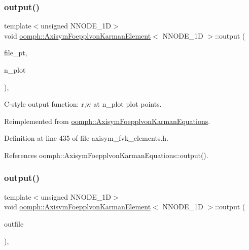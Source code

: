 \subsubsection{\texorpdfstring{output()}{output()}\hspace{0.1cm}{\footnotesize\ttfamily [4/8]}}
{\footnotesize\ttfamily template$<$unsigned N\+N\+O\+D\+E\+\_\+1D$>$ \\
void \hyperlink{classoomph_1_1AxisymFoepplvonKarmanElement}{oomph\+::\+Axisym\+Foepplvon\+Karman\+Element}$<$ N\+N\+O\+D\+E\+\_\+1D $>$\+::output (\begin{DoxyParamCaption}\item[{F\+I\+LE $\ast$}]{file\+\_\+pt,  }\item[{const unsigned \&}]{n\+\_\+plot }\end{DoxyParamCaption})\hspace{0.3cm}{\ttfamily [inline]}, {\ttfamily [virtual]}}



C-\/style output function\+: r,w at n\+\_\+plot plot points. 



Reimplemented from \hyperlink{classoomph_1_1AxisymFoepplvonKarmanEquations_a5278f37c336b7a4bd2931fdedd2945f8}{oomph\+::\+Axisym\+Foepplvon\+Karman\+Equations}.



Definition at line 435 of file axisym\+\_\+fvk\+\_\+elements.\+h.



References oomph\+::\+Axisym\+Foepplvon\+Karman\+Equations\+::output().

\mbox{\label{classoomph_1_1AxisymFoepplvonKarmanElement_a76cf09e19fc810a96251a64572248f76}} 
\subsubsection{\texorpdfstring{output()}{output()}\hspace{0.1cm}{\footnotesize\ttfamily [5/8]}}
{\footnotesize\ttfamily template$<$unsigned N\+N\+O\+D\+E\+\_\+1D$>$ \\
void \hyperlink{classoomph_1_1AxisymFoepplvonKarmanElement}{oomph\+::\+Axisym\+Foepplvon\+Karman\+Element}$<$ N\+N\+O\+D\+E\+\_\+1D $>$\+::output (\begin{DoxyParamCaption}\item[{std\+::ostream \&}]{outfile }\end{DoxyParamCaption})\hspace{0.3cm}{\ttfamily [inline]}, {\ttfamily [virtual]}}



